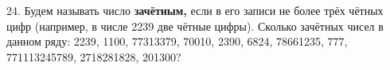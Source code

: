24. Будем называть число {\bf зачётным,} если в его записи не более трёх чётных цифр (например, в числе 2239 две чётные цифры). Сколько зачётных чисел в данном ряду: 2239, 1100, 77313379, 70010, 2390, 6824, 78661235, 777, 771113245789, 2718281828, 201300?\\
